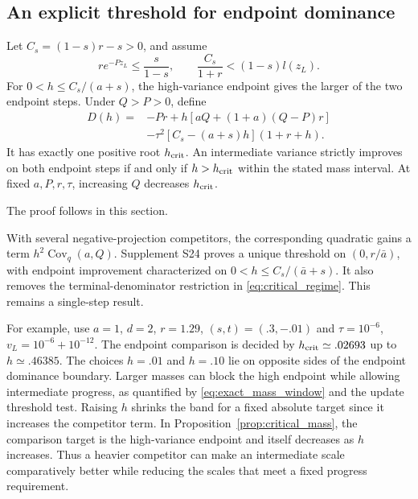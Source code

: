 \subsection{An explicit threshold for endpoint dominance}
\begin{proposition}\label{prop:critical_mass}
Let $C_s=(1-s)r-s>0$, and assume
\begin{equation}\label{eq:critical_regime}
 r e^{-Pz_L}\le\frac{s}{1-s},\qquad
 \frac{C_s}{1+r}<(1-s)l(z_L).
\end{equation}
For $0<h\le C_s/(a+s)$, the high-variance endpoint gives the larger
of the two endpoint steps. Under $Q>P>0$, define
\begin{align}
 D(h)={}&-Pr+h[aQ+(1+a)(Q-P)r]\nonumber\\
        &-\tau^2[C_s-(a+s)h](1+r+h).\label{eq:critical_mass}
\end{align}
It has exactly one positive root $h_{\rm crit}$. An intermediate
variance strictly improves on both endpoint steps if and only if
$h>h_{\rm crit}$ within the stated mass interval.
At fixed $a,P,r,\tau$, increasing $Q$ decreases $h_{\rm crit}$.
\end{proposition}

The proof follows in this section.

With several negative-projection competitors, the corresponding
quadratic gains a term $h^2\operatorname{Cov}_{q}(a,Q)$.
Supplement S24 proves a unique threshold on $(0,r/\bar a)$,
with endpoint improvement characterized on
$0<h\le C_s/(\bar a+s)$.
It also removes the terminal-denominator restriction in
\eqref{eq:critical_regime}. This remains a single-step result.

For example, use $a=1$, $d=2$, $r=1.29$, $(s,t)=(.3,-.01)$
and $\tau=10^{-6}$, $v_L=10^{-6}+10^{-12}$. The endpoint comparison
is decided by $h_{\rm crit}\simeq .02693$ up to $h\simeq .46385$.
The choices $h=.01$ and $h=.10$ lie on opposite sides of the
endpoint dominance boundary. Larger masses can block the high
endpoint while allowing intermediate progress, as quantified by
\eqref{eq:exact_mass_window} and the update threshold test.
Raising $h$ shrinks the band for a fixed absolute target since it
increases the competitor term. In Proposition~\ref{prop:critical_mass},
the comparison target is the high-variance endpoint and itself
decreases as $h$ increases. Thus a heavier competitor can make
an intermediate scale comparatively better while reducing the
scales that meet a fixed progress requirement.


